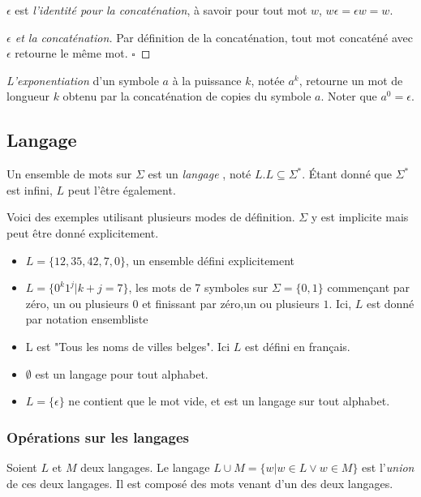\begin{lemma}
	$\epsilon$ est \emph{l'identité pour la concaténation}, à savoir pour tout mot $w$, $w\epsilon = \epsilon w = w$.
\end{lemma}

\begin{proof}[$\epsilon$ et la concaténation]
	Par définition de la concaténation, tout mot concaténé avec $\epsilon$ retourne le même mot. 
	\hfill$\square$
\end{proof}

\emph{L'exponentiation} d'un symbole $a$ à la puissance $k$, notée $a^k$, retourne un mot de longueur $k$ obtenu par la concaténation de copies du symbole $a$. Noter que $a^0=\epsilon$.

\subsection{Langage}

Un ensemble de mots sur $\Sigma$ est un \emph{langage} \cite{Hopcroft00}, noté $L$.$L \subseteq \Sigma^*$. Étant donné que $\Sigma^*$ est infini, $L$ peut l'être également.

\begin{example} Voici des exemples utilisant plusieurs modes de définition. $\Sigma$ y est implicite mais peut être donné explicitement.
	\begin{itemize}
		\item $L=\{12,35,42,7,0\}$, un ensemble défini explicitement
		\item $L=\{0^k1^j|k+j=7\}$, les mots de 7 symboles sur $\Sigma=\{0,1\}$ commençant par zéro, un ou plusieurs $0$ et finissant par zéro,un ou plusieurs $1$. Ici, $L$ est donné par notation ensembliste
		\item L est "Tous les noms de villes belges". Ici $L$ est défini en français.
		\item $\emptyset$ est un langage pour tout alphabet.
		\item $L=\{\epsilon\}$ ne contient que le mot vide, et est un langage sur tout alphabet.
	\end{itemize}
\end{example}


\subsubsection*{Opérations sur les langages}

Soient $L$ et $M$ deux langages. Le langage $L \cup M = \{w | w \in L\vee w \in M\}$ est l'\emph{union} de ces deux langages. Il est composé des mots venant d'un des deux langages.

